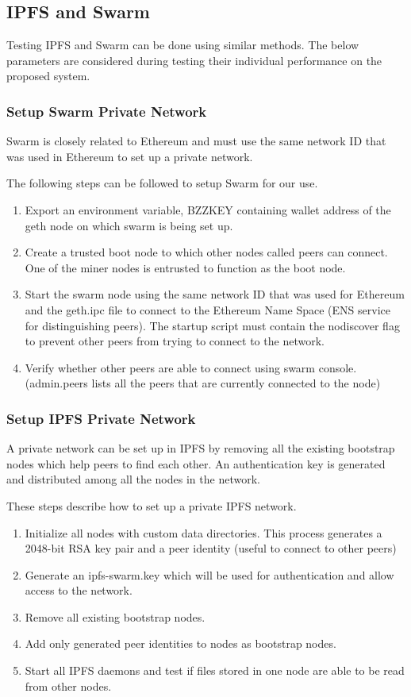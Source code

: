 \documentclass[11pt,openright]{report}
\begin{document}
\subsection{IPFS and Swarm}
Testing IPFS and Swarm can be done using similar methods. The below parameters are considered during testing their individual performance on the proposed system. 

\subsubsection{Setup Swarm Private Network}
Swarm is closely related to Ethereum and must use the same network ID that was used in Ethereum to set up a private network.

The following steps can be followed to setup Swarm for our use.
\begin{enumerate}
    \item Export an environment variable, BZZKEY containing wallet address of the geth node on which swarm is being set up.
    \item Create a trusted boot node to which other nodes called peers can connect. One of the miner nodes is entrusted to function as the boot node.
    \item Start the swarm node using the same network ID that was used for Ethereum and the geth.ipc file to connect to the Ethereum Name Space (ENS service for distinguishing peers). The startup script must contain the nodiscover flag to prevent other peers from trying to connect to the network.
    \item Verify whether other peers are able to connect using swarm console. (admin.peers lists all the peers that are currently connected to the node)
\end{enumerate}

\subsubsection{Setup IPFS Private Network}
A private network can be set up in IPFS by removing all the existing bootstrap nodes which help peers to find each other. An authentication key is generated and distributed among all the nodes in the network.

These steps describe how to set up a private IPFS network.
\begin{enumerate}
    \item Initialize all nodes with custom data directories. This process generates a 2048-bit RSA key pair and a peer identity (useful to connect to other peers)
    \item Generate an ipfs-swarm.key which will be used for authentication and allow access to the network.
    \item Remove all existing bootstrap nodes.
    \item Add only generated peer identities to nodes as bootstrap nodes.
    \item Start all IPFS daemons and test if files stored in one node are able to be read from other nodes.
\end{enumerate}
\end{document}
